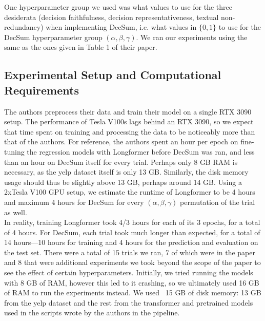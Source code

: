 \documentclass{article}
\begin{document}
One hyperparameter group we used was what values to use for the three desiderata (decision faithfulness, decision representativeness, textual non-redundancy) when implementing DecSum, i.e.
what values in $\{0,1\}$ to use for the DecSum hyperparameter group $(\alpha, \beta, \gamma)$.
We ran our experiments using the same as the ones given in Table 1 of their paper.

\subsection{Experimental Setup and Computational Requirements}
The authors preprocess their data and train their model on a single RTX 3090 setup. The performance of Tesla V100s lags behind an RTX 3090, so we expect that time spent on
training and processing the data to be noticeably more than that of the authors. For reference, the authors spent an hour per epoch on fine-tuning the regression models with Longformer
before DecSum was ran, and less than an hour on DecSum itself for every trial.
Perhaps only 8 GB RAM is necessary, as the yelp dataset itself is only 13 GB.
Similarly, the disk memory usage should thus be slightly above 13 GB, perhaps around 14 GB.
Using a 2xTesla V100 GPU setup, we estimate the runtime of Longformer to be 4 hours and maximum 4 hours for DecSum for every $(\alpha, \beta, \gamma)$ permutation of the trial as well. \\

In reality, training Longformer took 4/3 hours for each of its 3 epochs, for a total of 4 hours. For DecSum, each trial took much longer than expected, for a total of 14 hours—10 hours for training
and 4 hours for the prediction and evaluation on the test set.
There were a total of 15 trials we ran, 7 of which were in the paper and 8 that were additional experiments we took beyond the scope of the paper to see
the effect of certain hyperparameters. Initially, we tried running the models with 8 GB of RAM, however this led to it crashing, so we ultimately used 16 GB of RAM to run the experiments instead.
We used ~15 GB of disk memory: 13 GB from the yelp dataset and the rest from the transformer and pretrained models used in the scripts wrote by the authors in the pipeline.
\end{document}
